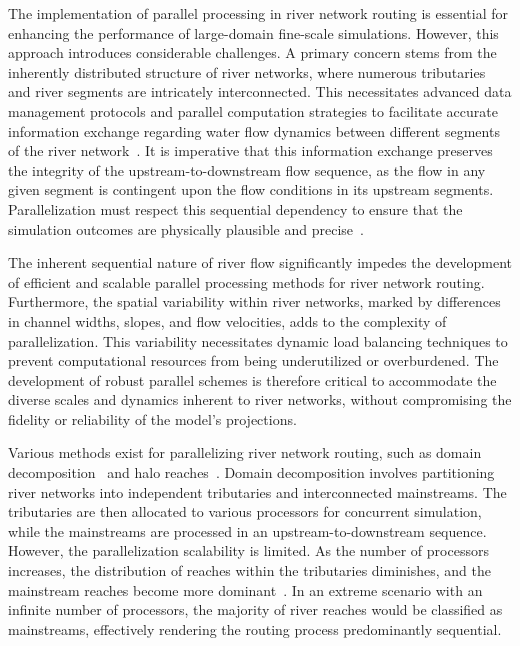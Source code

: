 \documentclass[water,article,submit,pdftex,moreauthors]{Definitions/mdpi}
\begin{document}
The implementation of parallel processing in river network routing is essential for enhancing the performance of large-domain fine-scale simulations. However, this approach introduces considerable challenges. A primary concern stems from the inherently distributed structure of river networks, where numerous tributaries and river segments are intricately interconnected. This necessitates advanced data management protocols and parallel computation strategies to facilitate accurate information exchange regarding water flow dynamics between different segments of the river network~\cite{liu2023JH}. It is imperative that this information exchange preserves the integrity of the upstream-to-downstream flow sequence, as the flow in any given segment is contingent upon the flow conditions in its upstream segments. Parallelization must respect this sequential dependency to ensure that the simulation outcomes are physically plausible and precise~\cite{david2013WRR, mizukami2021JAMES, liu2014EMS, liu2023JH}.

The inherent sequential nature of river flow significantly impedes the development of efficient and scalable parallel processing methods for river network routing. Furthermore, the spatial variability within river networks, marked by differences in channel widths, slopes, and flow velocities, adds to the complexity of parallelization. This variability necessitates dynamic load balancing techniques to prevent computational resources from being underutilized or overburdened. The development of robust parallel schemes is therefore critical to accommodate the diverse scales and dynamics inherent to river networks, without compromising the fidelity or reliability of the model's projections.

Various methods exist for parallelizing river network routing, such as domain decomposition~\cite{mizukami2021JAMES, liu2023JH} and halo reaches~\cite{david2013WRR}. Domain decomposition involves partitioning river networks into independent tributaries and interconnected mainstreams. The tributaries are then allocated to various processors for concurrent simulation, while the mainstreams are processed in an upstream-to-downstream sequence. However, the parallelization scalability is limited. As the number of processors increases, the distribution of reaches within the tributaries diminishes, and the mainstream reaches become more dominant~\cite{mizukami2021JAMES}. In an extreme scenario with an infinite number of processors, the majority of river reaches would be classified as mainstreams, effectively rendering the routing process predominantly sequential.
\end{document}
